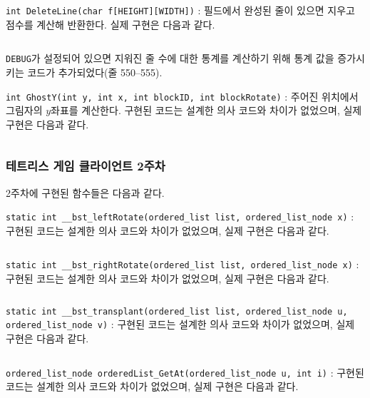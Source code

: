 \inputminted[xleftmargin=\parindent,linenos,firstline=504,lastline=526]{c}{inc-sources/tetris.c}

\texttt{int DeleteLine(char f[HEIGHT][WIDTH])}
: 필드에서 완성된 줄이 있으면 지우고 점수를 계산해 반환한다. 실제 구현은 다음과 같다.

\inputminted[xleftmargin=\parindent,linenos,firstline=528,lastline=558]{c}{inc-sources/tetris.c}

\texttt{DEBUG}가 설정되어 있으면 지워진 줄 수에 대한 통계를 계산하기 위해 통계 값을 증가시키는 코드가 추가되었다(줄 550--555).

\texttt{int GhostY(int y, int x, int blockID, int blockRotate)}
: 주어진 위치에서 그림자의 $y$좌표를 계산한다. 구현된 코드는 설계한 의사 코드와 차이가 없었으며, 실제 구현은 다음과 같다.

\inputminted[xleftmargin=\parindent,linenos,firstline=412,lastline=416]{c}{inc-sources/tetris.c}

\subsubsection{테트리스 게임 클라이언트 2주차} 2주차에 구현된 함수들은 다음과 같다.

\texttt{static int __bst_leftRotate(ordered_list list, ordered_list_node x)}
: 구현된 코드는 설계한 의사 코드와 차이가 없었으며, 실제 구현은 다음과 같다.

\inputminted[xleftmargin=\parindent,linenos,firstline=209,lastline=234]{c}{inc-sources/ordered-list.c}

\texttt{static int __bst_rightRotate(ordered_list list, ordered_list_node x)}
: 구현된 코드는 설계한 의사 코드와 차이가 없었으며, 실제 구현은 다음과 같다.

\inputminted[xleftmargin=\parindent,linenos,firstline=236,lastline=262]{c}{inc-sources/ordered-list.c}

\texttt{static int __bst_transplant(ordered_list list, ordered_list_node u, ordered_list_node v)}
: 구현된 코드는 설계한 의사 코드와 차이가 없었으며, 실제 구현은 다음과 같다.

\inputminted[xleftmargin=\parindent,linenos,firstline=264,lastline=274]{c}{inc-sources/ordered-list.c}

\texttt{ordered_list_node orderedList_GetAt(ordered_list_node u, int i)}
: 구현된 코드는 설계한 의사 코드와 차이가 없었으며, 실제 구현은 다음과 같다.

